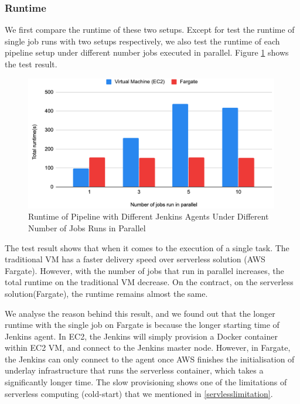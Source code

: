 \subsubsection{Runtime}
We first compare the runtime of these two setups. Except for test the runtime of single job runs with two setups respectively, we also test the runtime of each pipeline setup under different number jobs executed in parallel. Figure \ref{fig:runtime} shows the test result.
\begin{figure}[h]
\centering
\includegraphics[width=0.99\textwidth]{pics/runtime.png}
\caption{Runtime of Pipeline with Different Jenkins Agents Under Different Number of Jobs Runs in Parallel}
\label{fig:runtime}
\end{figure}
\par
The test result shows that when it comes to the execution of a single task. The traditional VM has a faster delivery speed over serverless solution (AWS Fargate). However, with the number of jobs that run in parallel increases, the total runtime on the traditional VM decrease. On the contract, on the serverless solution(Fargate), the runtime remains almost the same.
\par
We analyse the reason behind this result, and we found out that the longer runtime with the single job on Fargate is because the longer starting time of Jenkins agent. In EC2, the Jenkins will simply provision a Docker container within EC2 VM, and connect to the Jenkins master node. However, in Fargate, the Jenkins can only connect to the agent once AWS finishes the initialisation of underlay infrastructure that runs the serverless container, which takes a significantly longer time. The slow provisioning shows one of the limitations of serverless computing (cold-start) that we mentioned in \ref{servlesslimitation}.
